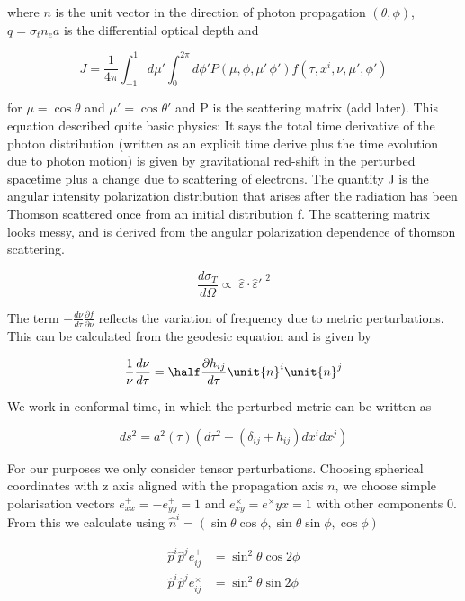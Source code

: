 where $\unit{n}$ is the unit vector in the direction of photon propagation $(\theta, \phi)$, $q=\sigma_tn_ea$ is the differential optical depth and

\begin{equation}
J=\frac{1}{4\pi} \int_{-1}^1 d\mu'\int_0^{2\pi} d\phi' P(\mu,\phi,\mu'\,\phi')f(\tau, x^i, \nu, \mu', \phi')
\end{equation}

for $\mu=\cos\theta$ and $\mu'=\cos\theta'$ and P is the scattering matrix (add later). This equation described quite basic physics: It says the total time derivative of the photon distribution (written as an explicit time derive plus the time evolution due to photon motion) is given by gravitational red-shift in the perturbed spacetime plus a change due to scattering of electrons. The quantity J is the angular intensity polarization distribution that arises after the radiation has been Thomson scattered once from an initial distribution f. The scattering matrix looks messy, and is derived from the angular polarization dependence of thomson scattering.

\begin{equation}
\frac{d\sigma_T}{d\Omega} \propto |\hat\varepsilon\cdot\hat\varepsilon'|^2
\end{equation}

The term $- \frac{d\nu}{d\tau}\frac{\partial f}{\partial \nu}$ reflects the variation of frequency due to metric perturbations. This can be calculated from the geodesic equation and is given by

\begin{equation}
\frac{1}{\nu}\frac{d\nu}{d\tau} = \half \frac{\partial h_{ij}}{d\tau}\unit{n}^i\unit{n}^j
\end{equation}

We work in conformal time, in which the perturbed metric can be written as 

\begin{equation}
ds^2 = a^2(\tau)(d\tau^2-(\delta_{ij}+h_{ij})dx^idx^j)
\end{equation}

For our purposes we only consider tensor perturbations. Choosing spherical coordinates with z axis aligned with the propagation axis $\unit{n}$, we choose simple polarisation vectors $e^+_{xx}=-e^+_{yy}=1$ and $e^\times_{xy}=e^\times{yx}=1$ with other components 0. From this we calculate using $\hat{n}^i = (\sin\theta\cos\phi, \sin\theta\sin\phi, \cos\phi)$

\begin{equation}\begin{split}
\hat{p}^i\hat{p}^je_{ij}^+ &= \sin^2{\theta}\cos{2\phi} \\
\hat{p}^i\hat{p}^je_{ij}^\times &= \sin^2{\theta}\sin{2\phi}
\end{split}\end{equation}

